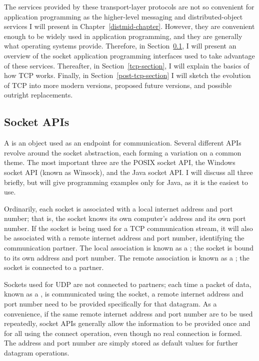 The services provided by these transport-layer protocols are not so
convenient for application programming as the higher-level messaging
and distributed-object services I will present in
Chapter~\ref{distmid-chapter}.  However, they are convenient enough to
be widely used in application programming, and they are generally what
operating systems provide.  Therefore, in Section~\ref{socket-APIs}, I
will present an overview of the socket application programming interfaces
used to take advantage of these services.  Thereafter, in
Section~\ref{tcp-section}, I will explain the basics of how TCP
works.  Finally, in Section~\ref{post-tcp-section} I will sketch the
evolution of TCP into more modern versions, proposed future versions,
and possible outright replacements.

\subsection{Socket APIs}\label{socket-APIs}

A  is an object used as an endpoint for communication.
Several different APIs revolve around the socket abstraction, each
forming a variation on a common theme.  The most important three are
the POSIX socket API, the Windows socket API (known as Winsock), and
the Java socket API.  I will discuss all three briefly, but will give
programming examples only for Java, as it is the easiest to use.

Ordinarily, each socket is associated with a local internet address and
port number; that is, the socket knows its own computer's address and
its own port number.  If the socket is being used for a TCP
communication stream, it will also be associated with a remote
internet address and port number, identifying the communication
partner.  The local association is known as a ; the
socket is bound to its own address and port number.  The remote
association is known as a ; the socket is connected
to a partner.

Sockets used for UDP are not connected to partners; each time a packet
of data, known as a , is communicated using the
socket, a remote internet address and port number need to be provided
specifically for that datagram.  As a convenience, if the same remote
internet address and port number are to be used repeatedly, socket APIs
generally allow the information to be provided once and for all using
the connect operation, even though no real connection is formed.  The
address and port number are simply stored as default values for
further datagram operations.

